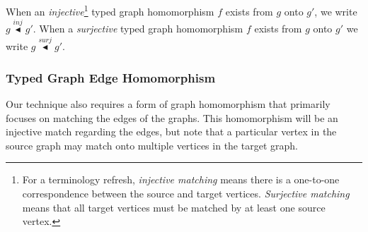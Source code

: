  When an \emph{injective}\footnote{For a terminology refresh, \textit{injective matching} means there is a one-to-one correspondence between the source and target vertices. \textit{Surjective matching} means that all target vertices must be matched by at least one source vertex.} typed graph homomorphism $f$ exists from $g$ onto $g'$, we write $g \stackrel{inj}{\blacktriangleleft} g'$. When a \emph{surjective} typed graph homomorphism $f$ exists from $g$ onto $g'$ we write $g \stackrel{surj}{\blacktriangleleft} g'$.

\subsubsection*{Typed Graph Edge Homomorphism}

Our technique also requires a form of graph homomorphism that primarily focuses on matching the edges of the graphs. This homomorphism will be an injective match regarding the edges, but note that a particular vertex in the source graph may match onto multiple vertices in the target graph. 

